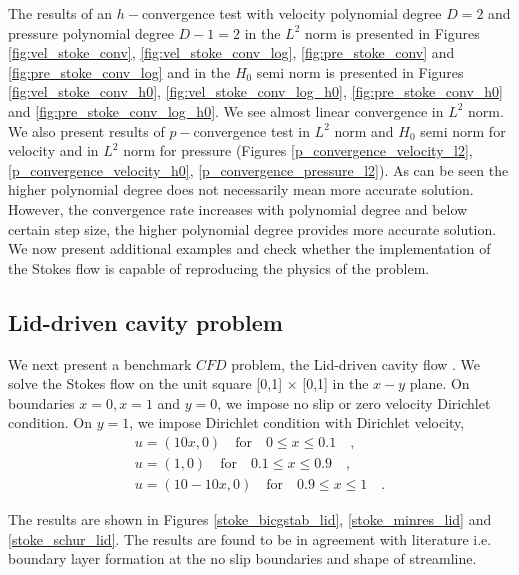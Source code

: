 \documentclass[a4paper,openany]{book}
\begin{document}
The results of an $h-$convergence test with velocity polynomial degree $D=2$ and pressure polynomial degree $D-1 = 2$ in the $L^2$ norm is presented in Figures \ref{fig:vel_stoke_conv}, \ref{fig:vel_stoke_conv_log}, \ref{fig:pre_stoke_conv} and \ref{fig:pre_stoke_conv_log} and in the $H_0$ semi norm is presented in Figures \ref{fig:vel_stoke_conv_h0}, \ref{fig:vel_stoke_conv_log_h0}, \ref{fig:pre_stoke_conv_h0} and \ref{fig:pre_stoke_conv_log_h0}. We see almost linear convergence in $L^2$ norm. \\

We also present results of $p-$convergence test in $L^2$ norm and $H_0$ semi norm for velocity and in $L^2$ norm for pressure (Figures \ref{p_convergence_velocity_l2}, \ref{p_convergence_velocity_h0}, \ref{p_convergence_pressure_l2}). As can be seen the higher polynomial degree does not necessarily mean more accurate solution. However, the convergence rate increases with polynomial degree and below certain step size, the higher polynomial degree provides more accurate solution.\\

We now present additional examples and check whether the implementation of the Stokes flow is capable of reproducing the physics of the problem.

\subsection{Lid-driven cavity problem} \label{lid_driven_cavity_stokes}

We next present a benchmark $CFD$ problem, the Lid-driven cavity flow \cite{Montlaur2}. We solve the Stokes flow on the unit square [0,1] $\times$ [0,1] in the $x-y$ plane. On boundaries ${x = 0}, {x = 1}$ and ${y = 0}$, we impose no slip or zero velocity Dirichlet condition. On ${y = 1}$, we impose Dirichlet condition with Dirichlet velocity,
\begin{equation}
\begin{split}
u = (10x,0) \quad \textrm{for} \quad 0 \leq x \leq 0.1 \quad \textrm{,}\\
u = (1,0) \quad \textrm{for} \quad 0.1 \leq x \leq 0.9 \quad \textrm{,}\\
u = (10 - 10x,0) \quad \textrm{for} \quad 0.9 \leq x \leq 1 \quad \textrm{.}
\end{split}
\end{equation}

The results are shown in Figures \ref{stoke_bicgstab_lid}, \ref{stoke_minres_lid} and \ref{stoke_schur_lid}. The results are found to be in agreement with literature i.e. boundary layer formation at the no slip boundaries and shape of streamline. 
\end{document}
